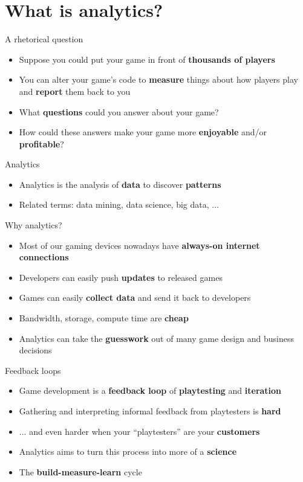 \part{What is analytics?}
\frame{\partpage}

\begin{frame}{A rhetorical question}
	\begin{itemize}
		\pause\item Suppose you could put your game in front of \textbf{thousands of players}
		\pause\item You can alter your game's code to \textbf{measure} things about how players play
			and \textbf{report} them back to you
		\pause\item What \textbf{questions} could you answer about your game?
		\pause\item How could these answers make your game more \textbf{enjoyable} and/or \textbf{profitable}?
	\end{itemize}
\end{frame}

\begin{frame}{Analytics}
	\begin{itemize}
		\pause\item Analytics is the analysis of \textbf{data} to discover \textbf{patterns}
		\pause\item Related terms: data mining, data science, big data, ...
	\end{itemize}
\end{frame}

\begin{frame}{Why analytics?}
	\begin{itemize}
		\pause\item Most of our gaming devices nowadays have \textbf{always-on internet connections}
		\pause\item Developers can easily push \textbf{updates} to released games
		\pause\item Games can easily \textbf{collect data} and send it back to developers
		\pause\item Bandwidth, storage, compute time are \textbf{cheap}
		\pause\item Analytics can take the \textbf{guesswork} out of many game design and business decisions
	\end{itemize}
\end{frame}

\begin{frame}{Feedback loops}
	\begin{itemize}
		\pause\item Game development is a \textbf{feedback loop} of \textbf{playtesting} and \textbf{iteration}
		\pause\item Gathering and interpreting informal feedback from playtesters is \textbf{hard}
		\pause\item ... and even harder when your ``playtesters'' are your \textbf{customers}
		\pause\item Analytics aims to turn this process into more of a \textbf{science}
		\pause\item The \textbf{build-measure-learn} cycle
	\end{itemize}
\end{frame}
